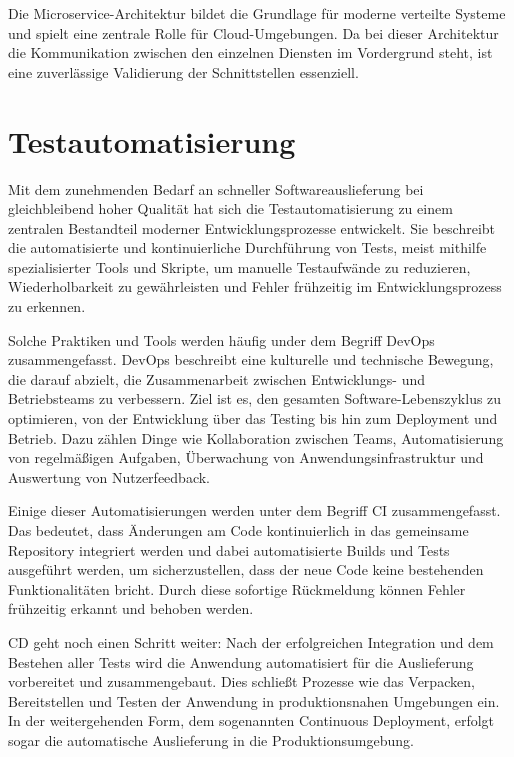 Die Microservice-Architektur bildet die Grundlage für moderne verteilte Systeme und spielt eine zentrale Rolle für Cloud-Umgebungen.
Da bei dieser Architektur die Kommunikation zwischen den einzelnen Diensten im Vordergrund steht, ist eine zuverlässige Validierung der Schnittstellen essenziell.


\section{Testautomatisierung}\label{sec:foundation_testautomation}

Mit dem zunehmenden Bedarf an schneller Softwareauslieferung bei gleichbleibend hoher Qualität hat sich die Testautomatisierung zu einem zentralen Bestandteil moderner Entwicklungsprozesse entwickelt.
Sie beschreibt die automatisierte und kontinuierliche Durchführung von Tests, meist mithilfe spezialisierter Tools und Skripte, um manuelle Testaufwände zu reduzieren, Wiederholbarkeit zu gewährleisten und Fehler frühzeitig im Entwicklungsprozess zu erkennen.

Solche Praktiken und Tools werden häufig under dem Begriff \gls{DevOps} zusammengefasst.
\gls{DevOps} beschreibt eine kulturelle und technische Bewegung, die darauf abzielt, die Zusammenarbeit zwischen Entwicklungs- und Betriebsteams zu verbessern.
Ziel ist es, den gesamten Software-Lebenszyklus zu optimieren, von der Entwicklung über das Testing bis hin zum \gls{Deployment} und Betrieb.
Dazu zählen Dinge wie Kollaboration zwischen Teams, Automatisierung von regelmäßigen Aufgaben, Überwachung von
Anwendungsinfrastruktur und Auswertung von Nutzerfeedback.

Einige dieser Automatisierungen werden unter dem Begriff \gls{CI} zusammengefasst.
Das bedeutet, dass Änderungen am Code kontinuierlich in das gemeinsame Repository integriert werden und dabei
automatisierte \glspl{Build} und Tests ausgeführt werden, um sicherzustellen, dass der neue Code keine bestehenden
Funktionalitäten bricht.
Durch diese sofortige Rückmeldung können Fehler frühzeitig erkannt und behoben werden.

\Gls{CD} geht noch einen Schritt weiter: Nach der erfolgreichen Integration und dem Bestehen aller Tests wird die
Anwendung automatisiert für die Auslieferung vorbereitet und zusammengebaut.
Dies schließt Prozesse wie das Verpacken, Bereitstellen und Testen der Anwendung in produktionsnahen Umgebungen ein.
In der weitergehenden Form, dem sogenannten Continuous Deployment, erfolgt sogar die automatische Auslieferung in die Produktionsumgebung.

